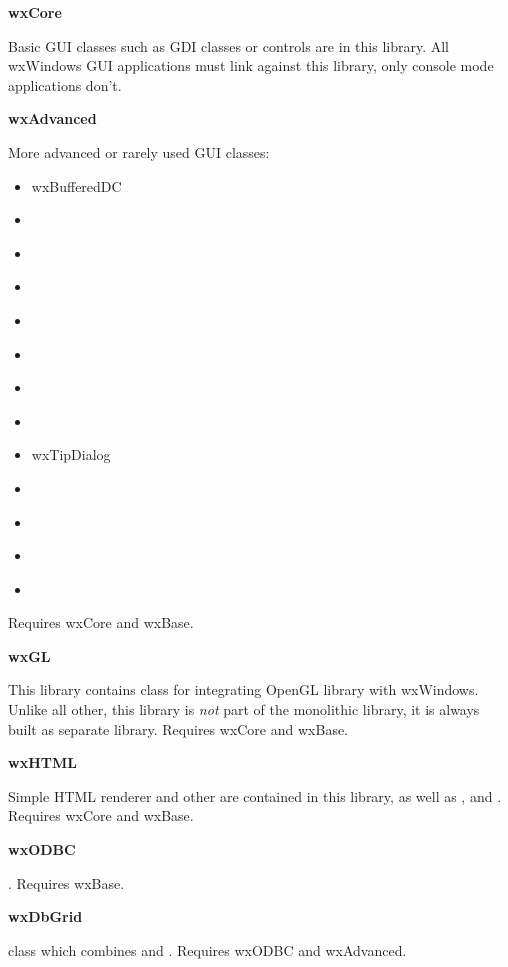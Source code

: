 {\large {\bf wxCore}}

Basic GUI classes such as GDI classes or controls are in this library. All
wxWindows GUI applications must link against this library, only console mode
applications don't.

{\large {\bf wxAdvanced}}

More advanced or rarely used GUI classes:

\begin{itemize}
\item{ wxBufferedDC }
\item{  }
\item{  }
\item{  }
\item{  }
\item{  }
\item{  }
\item{  }
\item{ wxTipDialog }
\item{  }
\item{  }
\item{  }
\item{  }
\end{itemize}

Requires wxCore and wxBase.

{\large {\bf wxGL}}

This library contains  class for integrating
OpenGL library with wxWindows. Unlike all other, this library is {\em not}
part of the monolithic library, it is always built as separate library.
Requires wxCore and wxBase.

{\large {\bf wxHTML}}

Simple HTML renderer and other  are
contained in this library, as well as
,
 and
. Requires wxCore and wxBase.

{\large {\bf wxODBC}}

. Requires wxBase.

{\large {\bf wxDbGrid}}

 class which combines 
 and . 
Requires wxODBC and wxAdvanced.


